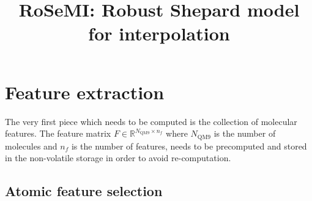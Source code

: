 \documentclass[12pt]{article}
\title{RoSeMI: Robust Shepard model for interpolation}
\begin{document}
\maketitle


\section{Feature extraction}
The very first piece which needs to be computed is the collection of molecular features. The feature matrix $F \in \mathbb{R}^{N_\text{QM9} \times n_f}$ where $N_\text{QM9}$ is the number of molecules and $n_f$ is the number of features, needs to be precomputed and stored in the non-volatile storage in order to avoid re-computation.
\subsection{Atomic feature selection}
\end{document}
